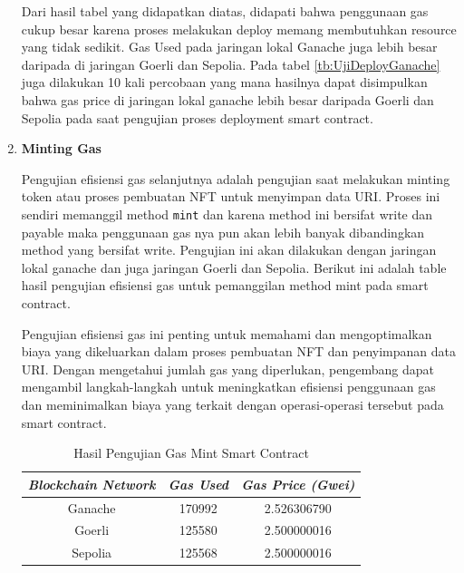 \begin{enumerate}
        Dari hasil tabel yang didapatkan diatas, didapati bahwa penggunaan gas cukup besar karena proses melakukan deploy memang membutuhkan resource yang tidak sedikit.
        Gas Used pada jaringan lokal Ganache juga lebih besar daripada di jaringan Goerli dan Sepolia. Pada tabel \ref{tb:UjiDeployGanache} juga dilakukan 10 kali percobaan
        yang mana hasilnya dapat disimpulkan bahwa gas price di jaringan lokal ganache lebih besar daripada Goerli dan Sepolia pada saat pengujian proses deployment smart contract.

  \item
        \textbf{Minting Gas}

        Pengujian efisiensi gas selanjutnya adalah pengujian saat melakukan minting token atau proses pembuatan NFT untuk menyimpan data URI.
        Proses ini sendiri memanggil method \texttt{mint} dan karena method ini bersifat write dan payable maka penggunaan gas nya pun akan lebih
        banyak dibandingkan method yang bersifat write. Pengujian ini akan dilakukan dengan jaringan lokal ganache dan juga jaringan Goerli dan Sepolia.
        Berikut ini adalah table hasil pengujian efisiensi gas untuk pemanggilan method mint pada smart contract.

        Pengujian efisiensi gas ini penting untuk memahami dan mengoptimalkan biaya yang dikeluarkan dalam proses pembuatan NFT dan penyimpanan data URI. Dengan mengetahui jumlah gas yang diperlukan, pengembang dapat mengambil langkah-langkah untuk meningkatkan efisiensi penggunaan gas dan meminimalkan biaya yang terkait dengan operasi-operasi tersebut pada smart contract.

        \begin{longtable}{|c|c|c|}
          \caption{Hasil Pengujian Gas Mint Smart Contract}
          \label{tb:UjiGasMint}                                                                            \\
          \hline
          \rowcolor[HTML]{C0C0C0}
          \textbf{\emph{Blockchain Network}} & \textbf{\emph{Gas Used}} & \textbf{\emph{Gas Price (Gwei)}} \\
          \hline
          Ganache                            & 170992                   & 2.526306790                      \\
          Goerli                             & 125580                   & 2.500000016                      \\
          Sepolia                            & 125568                   & 2.500000016                      \\
          \hline
        \end{longtable}


\end{enumerate}
